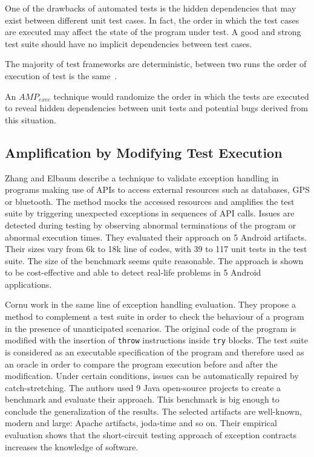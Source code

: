 One of the drawbacks of automated tests is the hidden dependencies that may exist between different unit test cases. 
In fact, the order in which the test cases are executed may affect the state of the program under test. 
A good and strong test suite should have no implicit dependencies between test cases.

The majority of test frameworks are deterministic, \ie between two runs the order of execution of test is the same~\cite{DBLP:conf/icsm/PalombaZ17,PalombaEMSE2019}.

An $AMP_{exec}$ technique would randomize the order in which the tests are executed to reveal hidden dependencies between unit tests and potential bugs derived from this situation.

\subsection{Amplification by Modifying Test Execution}
\label{subsec:sota:category-3:modifying-test-execution}

Zhang and Elbaum \cite{zhang2012,ZhangE14} describe a technique to validate exception handling in programs making use of APIs to access external resources such as databases, GPS or bluetooth.
The method mocks the accessed resources and amplifies the test suite by triggering unexpected exceptions in sequences of API calls.
Issues are detected during testing by observing abnormal terminations of the program or abnormal execution times. 
They evaluated their approach on 5 Android artifacts. 
Their sizes vary from 6k to 18k line of codes, with 39 to 117 unit tests in the test suite. 
The size of the benchmark seems quite reasonable. 
The approach is shown to be cost-effective and able to detect real-life problems in 5 Android applications.

Cornu \etal\cite{cornu2015exception} work in the same line of exception handling evaluation. 
They propose a method to complement a test suite in order to check the behaviour of a program in the presence of unanticipated scenarios. 
The original code of the program is modified with the insertion of \texttt{throw} instructions inside \texttt{try} blocks. 
The test suite is considered as an executable specification of the program and therefore used as an oracle in order to compare the program execution before and after the modification.
Under certain conditions, issues can be automatically repaired by catch-stretching.
The authors used 9 Java open-source projects to create a benchmark and evaluate their approach. 
This benchmark is big enough to conclude the generalization of the results. 
The selected artifacts are well-known, modern and large: Apache artifacts, joda-time and so on.
Their empirical evaluation shows that the short-circuit testing approach of exception contracts increases the knowledge of software.

